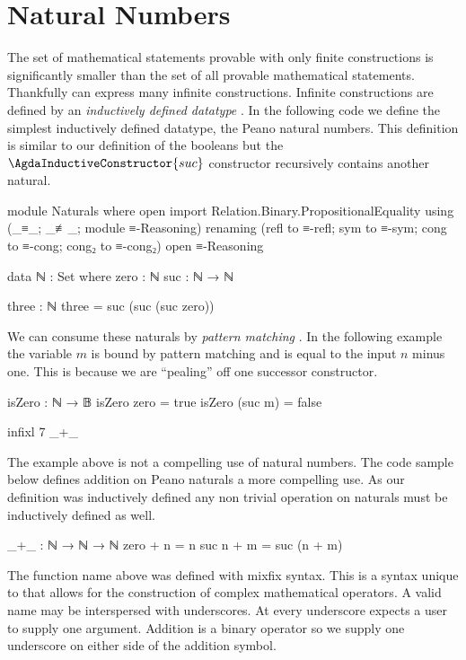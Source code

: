 \documentclass[./Thesis.tex]{subfiles}
\begin{document}
\section{Natural Numbers}
\label{sec:natural-numbers}
The set of mathematical statements provable with only finite constructions is
significantly smaller than the set of all provable mathematical statements.
Thankfully \Agda{} can express many infinite constructions\footnotemark{}.
Infinite constructions are defined by an \textit{inductively defined datatype}
\cite{agda}.
In the following code we define the simplest inductively defined datatype, the Peano
natural numbers. This definition is similar to our definition of the booleans
but the $\AgdaInductiveConstructor{suc}$ constructor recursively
contains another natural.
\begin{code}[hide]
  module Naturals where
    open import Relation.Binary.PropositionalEquality
      using (_≡_; _≢_; module ≡-Reasoning)
      renaming (refl to ≡-refl; sym to ≡-sym; cong to ≡-cong; cong₂ to ≡-cong₂)
    open ≡-Reasoning
\end{code}
\begin{code}
    data ℕ : Set where
      zero : ℕ
      suc  : ℕ → ℕ

    three : ℕ
    three = suc (suc (suc zero))
\end{code}
We can consume these naturals by \textit{pattern matching} \cite{agda}. In the
following example the variable $m$ is bound by pattern matching and is equal to
the input $n$ minus one. This is because we are ``pealing'' off one successor
constructor.
\begin{code}
    isZero : ℕ → 𝔹
    isZero zero = true
    isZero (suc m) = false
\end{code}
\begin{code}[hide]
    infixl 7 _+_
\end{code}
The example above is not a compelling use of natural numbers. The code sample
below defines addition on Peano naturals a more compelling use. As our definition was inductively
defined any non trivial operation on naturals must be inductively defined as
well.
\begin{code}
    _+_ : ℕ → ℕ → ℕ
    zero + n = n
    suc n + m = suc (n + m)
\end{code}
The function name above was defined with mixfix syntax. This is a syntax unique
to \Agda{} that allows for the construction of complex mathematical operators. A
valid name may be interspersed with underscores. At every underscore \Agda{}
expects a user to supply one argument. Addition is a binary operator so we
supply one underscore on either side of the addition symbol. \\
\end{document}
